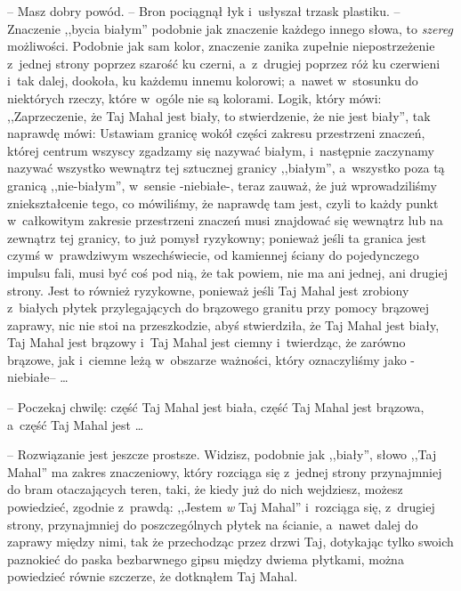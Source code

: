 \documentclass[oneside,polish,11pt,rmheadings]{mwbk}
\begin{document}
-- Masz dobry powód. -- Bron pociągnął łyk i~usłyszał trzask plastiku. -- Znaczenie ,,bycia białym'' podobnie jak znaczenie każdego innego słowa, to \textit{szereg }możliwości. Podobnie jak sam kolor, znaczenie zanika zupełnie niepostrzeżenie z~jednej strony poprzez szarość ku czerni, a~z~drugiej poprzez róż ku czerwieni i~tak dalej, dookoła, ku każdemu innemu kolorowi; a~nawet w~stosunku do niektórych rzeczy, które w~ogóle nie są kolorami. Logik, który mówi: ,,Zaprzeczenie, że Taj Mahal jest biały, to stwierdzenie, że nie jest biały'', tak naprawdę mówi: Ustawiam granicę wokół części zakresu przestrzeni znaczeń, której centrum wszyscy zgadzamy się nazywać białym, i~następnie zaczynamy nazywać wszystko wewnątrz tej sztucznej granicy ,,białym'', a~wszystko poza tą granicą ,,nie-białym'', w~sensie -niebiałe-, teraz zauważ, że już wprowadziliśmy zniekształcenie tego, co mówiliśmy, że naprawdę tam jest, czyli to każdy punkt w~całkowitym zakresie przestrzeni znaczeń musi znajdować się wewnątrz lub na zewnątrz tej granicy, to już pomysł ryzykowny; ponieważ jeśli ta granica jest czymś w~prawdziwym wszechświecie, od kamiennej ściany do pojedynczego impulsu fali, musi być coś pod nią, że tak powiem, nie ma ani jednej, ani drugiej strony. Jest to również ryzykowne, ponieważ jeśli Taj Mahal jest zrobiony z~białych płytek przylegających do brązowego granitu przy pomocy brązowej zaprawy, nic nie stoi na przeszkodzie, abyś stwierdziła, że Taj Mahal jest biały, Taj Mahal jest brązowy i~Taj Mahal jest ciemny i~twierdząc, że zarówno brązowe, jak i~ciemne leżą w~obszarze ważności, który oznaczyliśmy jako -niebiałe-- \ldots  

-- Poczekaj chwilę: część Taj Mahal jest biała, część Taj Mahal jest brązowa, a~część Taj Mahal jest \ldots  

-- Rozwiązanie jest jeszcze prostsze. Widzisz, podobnie jak ,,biały'', słowo ,,Taj Mahal'' ma zakres znaczeniowy, który rozciąga się z~jednej strony przynajmniej do bram otaczających teren, taki, że kiedy już do nich wejdziesz, możesz powiedzieć, zgodnie z~prawdą: ,,Jestem \textit{w }Taj Mahal'' i~rozciąga się, z~drugiej strony, przynajmniej do poszczególnych płytek na ścianie, a~nawet dalej do zaprawy między nimi, tak że przechodząc przez drzwi Taj, dotykając tylko swoich paznokieć do paska bezbarwnego gipsu między dwiema płytkami, można powiedzieć równie szczerze, że dotknąłem Taj Mahal. 
\end{document}
